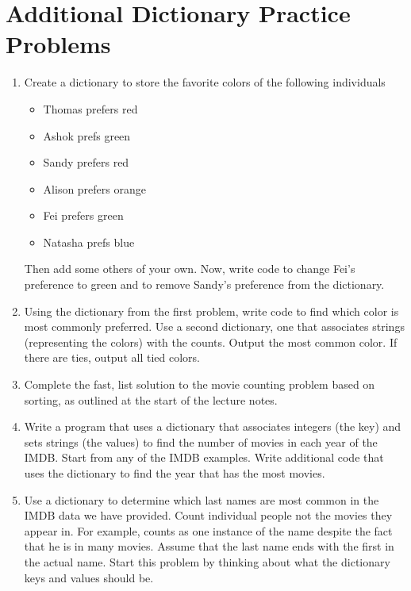 \documentclass[letterpaper,10pt,english]{sphinxmanual}
\begin{document}
\section{Additional Dictionary Practice Problems}
\label{\detokenize{lecture_notes/lec17_dictionaries2:additional-dictionary-practice-problems}}\begin{enumerate}
\item {} 
Create a dictionary to store the favorite colors of the following
individuals
\begin{itemize}
\item {} 
Thomas prefers red

\item {} 
Ashok prefs green

\item {} 
Sandy prefers red

\item {} 
Alison prefers orange

\item {} 
Fei prefers green

\item {} 
Natasha prefs blue

\end{itemize}

Then add some others of your own. Now, write code to change Fei’s
preference to green and to remove Sandy’s preference from the
dictionary.

\item {} 
Using the dictionary from the first problem, write code to find which
color is most commonly preferred. Use a second dictionary, one that
associates strings (representing the colors) with the counts. Output
the most common color. If there are ties, output all tied colors.

\item {} 
Complete the fast, list solution to the movie counting problem based
on sorting, as outlined at the start of the lecture notes.

\item {} 
Write a program that uses a dictionary that associates integers
(the key) and sets strings (the values) to find the number of
movies in each year of the IMDB. Start from any of the IMDB examples.
Write additional code
that uses the  dictionary to find the year that
has the most movies.

\item {} 
Use a dictionary to determine which last names are most common in the
IMDB data we have provided. Count individual people not the movies
they appear in. For example,  counts as one instance
of the name  despite the fact that he is in many movies.
Assume that the last name ends with the first  in the actual
name. Start this problem by thinking about what the dictionary keys
and values should be.


\end{enumerate}
\end{document}
